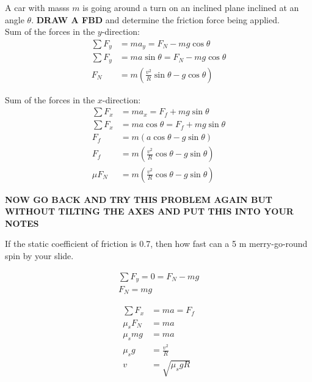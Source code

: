 \begin{problem}
	A car with masss $m$ is going around a turn on an inclined plane inclined at an angle $\theta$. \textbf{DRAW A FBD} and determine the friction force being applied.\\


	Sum of the forces in the $y$-direction:
	$$
	\begin{aligned}
		\sum F_y &= ma_y = F_N - mg\cos\theta\\
		\sum F_y &= ma\sin\theta = F_N - mg\cos\theta\\
		F_N &= m\left(\frac{v^2}{R}\sin\theta - g\cos\theta\right)
	\end{aligned}
	$$


	Sum of the forces in the $x$-direction:
	$$
	\begin{aligned}
		\sum F_x &= ma_x = F_f + mg\sin\theta\\
		\sum F_x &= ma\cos\theta = F_f + mg\sin\theta\\
		F_f &= m(a\cos\theta - g\sin\theta)\\
		F_f &= m\left(\frac{v^2}{R}\cos\theta - g\sin\theta\right)\\
		\mu F_N &= m\left(\frac{v^2}{R}\cos\theta - g\sin\theta\right)
	\end{aligned}
	$$

	\textbf{NOW GO BACK AND TRY THIS PROBLEM AGAIN BUT WITHOUT TILTING THE AXES AND PUT THIS INTO YOUR NOTES}
\end{problem}


\begin{problem}
	If the static coefficient of friction is 0.7, then how fast can a 5 m merry-go-round spin by your slide. 

	$$
	\begin{aligned}
		\sum F_y = 0 = F_N - mg\\
		F_N = mg
	\end{aligned}
	$$

	$$
	\begin{aligned}
		\sum F_x &= ma = F_f\\
		\mu_sF_N &= ma\\
		\mu_smg &= ma\\
		\mu_sg &= \frac{v^2}{R}\\
		v &= \sqrt{\mu_sgR}
	\end{aligned}
	$$
\end{problem}
